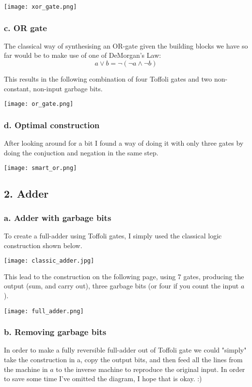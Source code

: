 \documentclass[12pt]{report}
\begin{document}
    \texttt{[image: xor\_gate.png]}
  \subsubsection*{c. OR gate }
    The classical way of synthesising an OR-gate given the building blocks we have so far would be to make use of one of DeMorgan's Law:
    $$ a \lor b = \neg ( \neg a \land \neg b) $$

    This results in the following combination of four Toffoli gates and two non-constant, non-input garbage bits.

    \texttt{[image: or\_gate.png]}

  \subsubsection*{d. Optimal construction}
    After looking around for a bit I found a way of doing it with only three gates by doing the conjuction and negation in the same step.

    \texttt{[image: smart\_or.png]}

\subsection*{2. Adder}
  \subsubsection*{a. Adder with garbage bits}
    To create a full-adder using Toffoli gates, I simply used the classical logic construction shown below.

    \texttt{[image: classic\_adder.jpg]}

    This lead to the construction on the following page, using 7 gates, producing the output (sum, and carry out), three garbage bits (or four if you count the input $a$).

    \texttt{[image: full\_adder.png]}

  \subsubsection*{b. Removing garbage bits}
    In order to make a fully reversible full-adder out of Toffoli gate we could "simply" take the construction in a, copy the output bits, and then feed all the lines from the machine in $a$ to the inverse machine to reproduce the original input. In order to save some time I've omitted the diagram, I hope that is okay. :)
\end{document}

